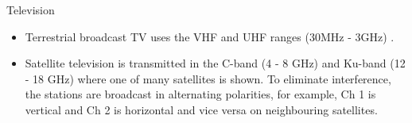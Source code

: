 


{\Large Television}
{
\begin{itemize}

\item Terrestrial broadcast TV uses the VHF and UHF ranges (30MHz - 3GHz)  \hspace{.1in}.

\item Satellite television is transmitted in the C-band (4 - 8 GHz)
\hspace{.1in} and Ku-band (12 - 18 GHz)  \hspace{.08in} where one of many satellites is shown. To eliminate interference, the stations are broadcast in alternating polarities, for example, Ch 1 is vertical and Ch 2 is horizontal and vice versa on neighbouring satellites.


\end{itemize}}
